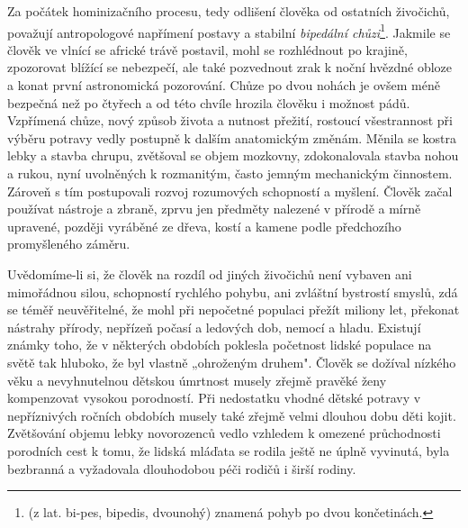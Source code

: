         Za počátek hominizačního procesu, tedy odlišení člověka od ostatních živočichů, považují
        antropologové napřímení postavy a stabilní \emph{bipedální chůzi}\footnote{(z lat. bi-pes,
        bipedis, dvounohý) znamená pohyb po dvou končetinách.}. Jakmile se člověk ve vlnící se
        africké trávě postavil, mohl se rozhlédnout po krajině, zpozorovat blížící se nebezpečí, ale
        také pozvednout zrak k noční hvězdné obloze a konat první astronomická pozorování. Chůze po
        dvou nohách je ovšem méně bezpečná než po čtyřech a od této chvíle hrozila člověku i možnost
        pádů. Vzpřímená chůze, nový způsob života a nutnost přežití, rostoucí všestrannost při
        výběru potravy vedly postupně k dalším anatomickým změnám. Měnila se kostra lebky a stavba
        chrupu, zvětšoval se objem mozkovny, zdokonalovala stavba nohou a rukou, nyní uvolněných k
        rozmanitým, často jemným mechanickým činnostem. Zároveň s tím postupovali rozvoj rozumových
        schopností a myšlení. Člověk začal používat nástroje a zbraně, zprvu jen předměty nalezené v
        přírodě a mírně upravené, později vyráběné ze dřeva, kostí a kamene podle předchozího
        promyšleného záměru.

        Uvědomíme-li si, že člověk na rozdíl od jiných živočichů není vybaven ani mimořádnou silou,
        schopností rychlého pohybu, ani zvláštní bystrostí smyslů, zdá se téměř neuvěřitelné, že
        mohl při nepočetné populaci přežít miliony let, překonat nástrahy přírody, nepřízeň počasí a
        ledových dob, nemocí a hladu. Existují známky toho, že v některých obdobích poklesla
        početnost lidské populace na světě tak hluboko, že byl vlastně „ohroženým druhem". Člověk se
        dožíval nízkého věku a nevyhnutelnou dětskou úmrtnost musely zřejmě pravěké ženy kompenzovat
        vysokou porodností. Při nedostatku vhodné dětské potravy v nepříznivých ročních obdobích
        musely také zřejmě velmi dlouhou dobu děti kojit. Zvětšování objemu lebky novorozenců vedlo
        vzhledem k omezené průchodnosti porodních cest k tomu, že lidská mláďata se rodila ještě ne
        úplně vyvinutá, byla bezbranná a vyžadovala dlouhodobou péči rodičů i širší rodiny.

